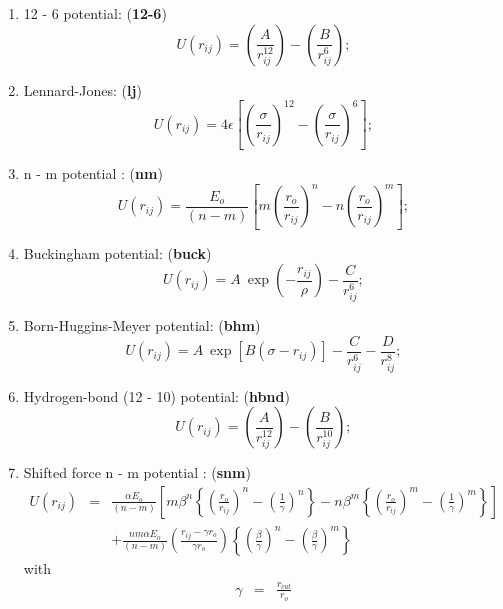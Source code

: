 \begin{enumerate}
\item 12 - 6 potential: ({\bf 12-6})
\begin{equation}
U(r_{ij})=\left(\frac{A}{r_{ij}^{12}}\right)-\left(\frac{B}{r_{ij}^{6}}\right);
\end{equation}
\item Lennard-Jones: ({\bf lj})
\begin{equation}
U(r_{ij})=4\epsilon\left[\left
(\frac{\sigma}{r_{ij}}\right)^{12}-\left(\frac{\sigma}{r_{ij}}\right)^{6}\right
];
\end{equation}
\item n - m potential \cite{clarke-86a}: ({\bf nm})
\begin{equation}
U(r_{ij})=\frac{E_{o}}{(n-m)}\left[m\left 
(\frac{r_{o}}{r_{ij}}\right)^{n}-n\left(\frac{r_{o}}{r_{ij}}\right)^{m}\right
];
\end{equation}
\item Buckingham potential: ({\bf buck})
\begin{equation}
U(r_{ij})=A~\exp\left(-\frac{r_{ij}}{\rho}\right)-\frac{C}{r_{ij}^{6}};
\end{equation}
\item Born-Huggins-Meyer potential: ({\bf bhm})
\begin{equation}
U(r_{ij})=A~\exp[B(\sigma-r_{ij})]-\frac{C}{r_{ij}^{6}}-\frac{D}{r_{ij}^{8}};
\end{equation}
\item Hydrogen-bond (12 - 10) potential: ({\bf hbnd})
\begin{equation}
U(r_{ij})=\left(\frac{A}{r_{ij}^{12}}\right)-\left(\frac{B}{r_{ij}^{10}}\right);
\end{equation}
\item Shifted force n - m potential \cite{clarke-86a}: ({\bf snm})
\begin{eqnarray}
U(r_{ij})&=&\frac{\alpha E_{o}}{(n-m)}\left [
m\beta^{n}\left \{ \left (\frac{r_{o}}{r_{ij}}\right )^{n}-
\left(\frac{1}{\gamma}\right)^{n}\right \}-
n\beta^{m}\left \{ \left (\frac{r_{o}}{r_{ij}}\right )^{m}-
\left(\frac{1}{\gamma}\right)^{m}\right \} \right ]\nonumber \\
& & +\frac{nm\alpha E_{o}}{(n-m)} \left ( \frac{r_{ij}-\gamma r_{o}}{\gamma r_{o}}
\right )\left\{\left(\frac{\beta}{\gamma}\right
)^{n}-\left(\frac{\beta}{\gamma}\right )^{m}\right \}
\end{eqnarray}
with
\begin{eqnarray}
\gamma &=&\frac{r_{cut}}{r_{o}} \\

\end{eqnarray}
\end{enumerate}
